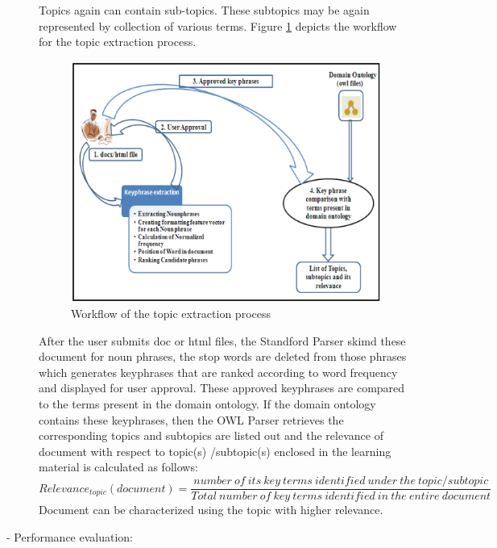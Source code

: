 \begin{description}
\begin{itemize}
				\end{itemize}
					Topics again can contain sub-topics. These subtopics may be again represented by collection of various terms.
Figure \ref{workfow} depicts the workflow for the topic extraction process. 
                \begin{figure}[h!]
					\centering
					\includegraphics[scale=0.7]{graphics/workflow.PNG} 
					\caption{Workflow of the topic extraction process \cite{a:ont}} \label{workfow} 
				\end{figure}
After the user submits doc or html files, the Standford Parser \cite {standford} skimd these document for noun phrases, the stop words are deleted from those phrases which generates keyphrases that are ranked according to word frequency and displayed for user approval. These approved keyphrases are compared to the terms present in the domain ontology. If the domain ontology contains these keyphrases, then the OWL Parser retrieves the corresponding topics and subtopics are listed out and the relevance of document with respect to topic(s) /subtopic(s) 
enclosed in the learning material is calculated as follows:  \\	
 \[Relevance_{topic}(document)= \frac{number\ of\ its\ key\ terms\ identified\ under\ the\ topic/subtopic}{Total\ number\ of\ key\ terms\ identified\ in\ the\ entire\ document} \] 
Document can be characterized using the topic with higher relevance. 
\item[- Performance evaluation:]
		

\end{description}
